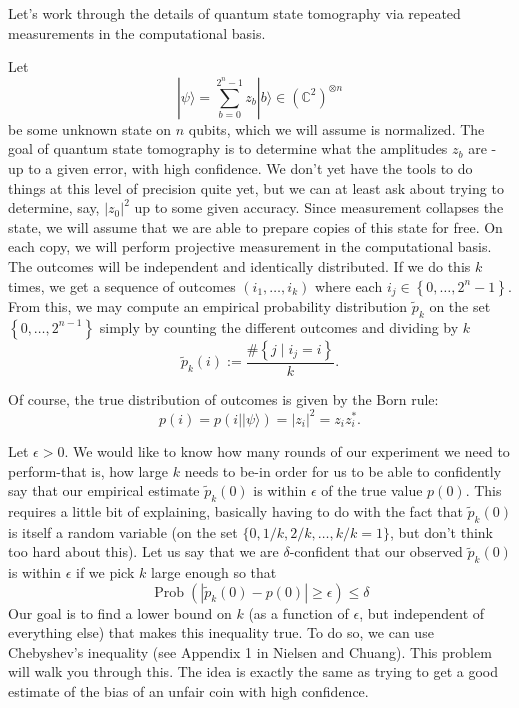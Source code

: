	Let's work through the details of quantum state tomography via repeated measurements in the computational basis.

Let
\[
|\psi\rangle=\sum_{b=0}^{2^n-1} z_b|b\rangle \in\left(\mathbb{C}^2\right)^{\otimes n}
\]
be some unknown state on $n$ qubits, which we will assume is normalized. The goal of quantum state tomography is to determine what the amplitudes $z_b$ are - up to a given error, with high confidence. We don't yet have the tools to do things at this level of precision quite yet, but we can at least ask about trying to determine, say, $\left|z_0\right|^2$ up to some given accuracy.
Since measurement collapses the state, we will assume that we are able to prepare copies of this state for free. On each copy, we will perform projective measurement in the computational basis. The outcomes will be independent and identically distributed. If we do this $k$ times, we get a sequence of outcomes $\left(i_1, \ldots, i_k\right)$ where each $i_j \in\left\{0, \ldots, 2^n-1\right\}$. From this, we may compute an empirical probability distribution $\tilde{p}_k$ on the set $\left\{0, \ldots, 2^{n-1}\right\}$ simply by counting the different outcomes and dividing by $k$
\[
\tilde{p}_k(i):=\frac{\#\left\{j \mid i_j=i\right\}}{k} .
\]

Of course, the true distribution of outcomes is given by the Born rule:
\[
p(i)=p(i|| \psi\rangle)=\left|z_i\right|^2=z_i z_i^* .
\]

Let $\epsilon>0$. We would like to know how many rounds of our experiment we need to perform-that is, how large $k$ needs to be-in order for us to be able to confidently say that our empirical estimate $\tilde{p}_k(0)$ is within $\epsilon$ of the true value $p(0)$. This requires a little bit of explaining, basically having to do with the fact that $\tilde{p}_k(0)$ is itself a random variable (on the set $\{0,1 / k, 2 / k, \ldots, k / k=1\}$, but don't think too hard about this).
Let us say that we are $\delta$-confident that our observed $\tilde{p}_k(0)$ is within $\epsilon$ if we pick $k$ large enough so that
\[
\operatorname{Prob}\left(\left|\tilde{p}_k(0)-p(0)\right| \geq \epsilon\right) \leq \delta
\]
Our goal is to find a lower bound on $k$ (as a function of $\epsilon$, but independent of everything else) that makes this inequality true.
To do so, we can use Chebyshev's inequality (see Appendix 1 in Nielsen and Chuang). This problem will walk you through this. The idea is exactly the same as trying to get a good estimate of the bias of an unfair coin with high confidence.

